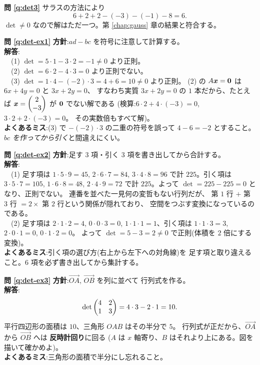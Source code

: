 \bigskip
\noindent\textbf{問 \ref{q:det3}}\quad
サラスの方法により
\[
6 + 2 + 2 - (-3) - (-1) - 8 = 6.
\]
$\det \neq 0$ なので解はただ一つ。第 \ref{chap:gauss} 章の結果と符合する。

\bigskip
\noindent\textbf{問 \ref{q:det-ex1}}\quad
\textbf{方針}:$ad - bc$ を符号に注意して計算する。\\
\textbf{解答}:\\
　(1) $\det = 5 \cdot 1 - 3 \cdot 2 = -1 \neq 0$ より正則。\\
　(2) $\det = 6 \cdot 2 - 4 \cdot 3 = 0$ より正則でない。\\
　(3) $\det = 1 \cdot 4 - (-2) \cdot 3 = 4 + 6 = 10 \neq 0$ より正則。
(2) の $A\bm{x} = \bm{0}$ は $6x + 4y = 0$ と $3x + 2y = 0$、
すなわち実質 $3x + 2y = 0$ の $1$ 本だから、たとえば
$\bm{x} = \begin{pmatrix}2 \\ -3\end{pmatrix}$ が $\bm{0}$ でない解である
(検算:$6 \cdot 2 + 4 \cdot (-3) = 0$, $3 \cdot 2 + 2 \cdot (-3) = 0$。
その実数倍もすべて解)。\\
\textbf{よくあるミス}:(3) で $-(-2) \cdot 3$ の二重の符号を誤って
$4 - 6 = -2$ とすること。\emph{$bc$ を作ってから引く}と間違えにくい。

\bigskip
\noindent\textbf{問 \ref{q:det-ex2}}\quad
\textbf{方針}:足す $3$ 項・引く $3$ 項を書き出してから合計する。\\
\textbf{解答}:\\
　(1) 足す項は
$1 \cdot 5 \cdot 9 = 45$, $2 \cdot 6 \cdot 7 = 84$, $3 \cdot 4 \cdot 8 = 96$
で計 $225$。引く項は
$3 \cdot 5 \cdot 7 = 105$, $1 \cdot 6 \cdot 8 = 48$, $2 \cdot 4 \cdot 9 = 72$
で計 $225$。よって $\det = 225 - 225 = 0$ となり、正則でない。
連番を並べた一見何の変哲もない行列だが、
第 $1$ 行 $+$ 第 $3$ 行 $= 2 \times$ 第 $2$ 行という関係が隠れており、
空間をつぶす変換になっているのである。\\
　(2) 足す項は $2 \cdot 1 \cdot 2 = 4$, $0 \cdot 0 \cdot 3 = 0$,
$1 \cdot 1 \cdot 1 = 1$、引く項は $1 \cdot 1 \cdot 3 = 3$,
$2 \cdot 0 \cdot 1 = 0$, $0 \cdot 1 \cdot 2 = 0$。
よって $\det = 5 - 3 = 2 \neq 0$ で正則(体積を $2$ 倍にする変換)。\\
\textbf{よくあるミス}:引く項の選び方(右上から左下への対角線)を
足す項と取り違えること。$6$ 項を必ず書き出してから集計する。

\bigskip
\noindent\textbf{問 \ref{q:det-ex3}}\quad
\textbf{方針}:$\overrightarrow{OA}$, $\overrightarrow{OB}$ を列に並べて
行列式を作る。\\
\textbf{解答}:
\[
\det \begin{pmatrix}4 & 2 \\ 1 & 3\end{pmatrix} = 4 \cdot 3 - 2 \cdot 1 = 10.
\]
平行四辺形の面積は $10$、三角形 $OAB$ はその半分で $5$。
行列式が正だから、$\overrightarrow{OA}$ から $\overrightarrow{OB}$ へは
\textbf{反時計回り}に回る
($A$ は $x$ 軸寄り、$B$ はそれより上にある。図を描いて確かめよ)。\\
\textbf{よくあるミス}:三角形の面積で半分にし忘れること。

